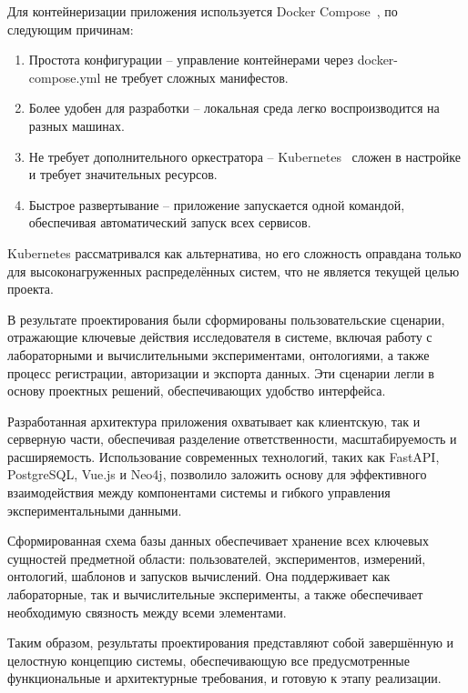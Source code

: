 Для контейнеризации приложения используется Docker Compose~\cite{Tool:DockerCompose}, по следующим причинам:
\begin{enumerate}
    \item Простота конфигурации -- управление контейнерами через docker-compose.yml не требует сложных манифестов.
    \item Более удобен для разработки -- локальная среда легко воспроизводится на разных машинах.
    \item Не требует дополнительного оркестратора -- Kubernetes~\cite{Tool:Kubernetes} сложен в настройке и требует значительных ресурсов.
    \item Быстрое развертывание -- приложение запускается одной командой, обеспечивая автоматический запуск всех сервисов.
\end{enumerate}

Kubernetes рассматривался как альтернатива, но его сложность оправдана только для высоконагруженных распределённых систем, что не является текущей целью проекта.


В результате проектирования были сформированы пользовательские сценарии, отражающие ключевые действия исследователя в системе, включая работу с лабораторными и вычислительными экспериментами, онтологиями, а также процесс регистрации, авторизации и экспорта данных. Эти сценарии легли в основу проектных решений, обеспечивающих удобство интерфейса.

Разработанная архитектура приложения охватывает как клиентскую, так и серверную части, обеспечивая разделение ответственности, масштабируемость и расширяемость. Использование современных технологий, таких как FastAPI, PostgreSQL, Vue.js и Neo4j, позволило заложить основу для эффективного взаимодействия между компонентами системы и гибкого управления экспериментальными данными.

Сформированная схема базы данных обеспечивает хранение всех ключевых сущностей предметной области: пользователей, экспериментов, измерений, онтологий, шаблонов и запусков вычислений. Она поддерживает как лабораторные, так и вычислительные эксперименты, а также обеспечивает необходимую связность между всеми элементами.

Таким образом, результаты проектирования представляют собой завершённую и целостную концепцию системы, обеспечивающую все предусмотренные функциональные и архитектурные требования, и готовую к этапу реализации.